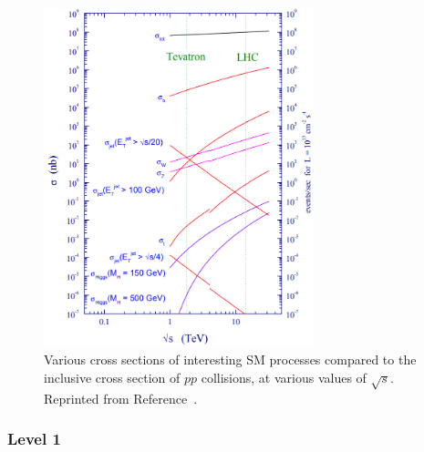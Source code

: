 \begin{figure}[]
\begin{center}
    \includegraphics[width=0.7\textwidth]{figures/cms/xsec.png}
    \caption{Various cross sections of interesting SM processes compared to the inclusive cross section of $pp$ collisions, at various values of $\sqrt{s}$.
                Reprinted from Reference~\cite{lhcxsec}.}
    \label{fig:cms:xsecs}
\end{center}
\end{figure}

\subsubsection{Level 1}


